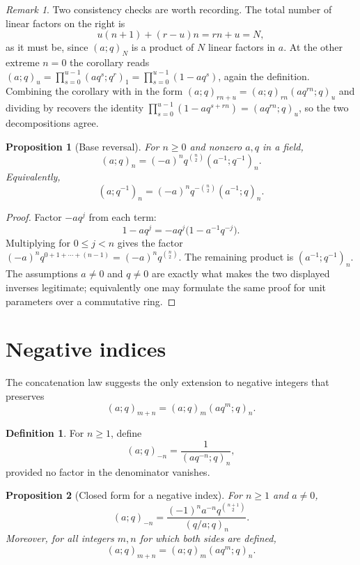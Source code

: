 \documentclass[11pt,a4paper,oneside,openany]{book}
\newtheorem{proposition}[proposition]{Proposition}
\theoremstyle{definition}
\newtheorem{definition}[definition]{Definition}
\theoremstyle{remark}
\newtheorem{remark}[remark]{Remark}
\begin{document}
\begin{remark}\label{rem:dissection-remainder-checks}
Two consistency checks are worth recording.  The total number of linear factors on the right is
\[
 u(n+1)+(r-u)n=rn+u=N,
\]
as it must be, since $(a;q)_N$ is a product of $N$ linear factors in $a$.  At the other extreme $n=0$ the corollary reads $(a;q)_u=\prod_{s=0}^{u-1}(aq^s;q^r)_1=\prod_{s=0}^{u-1}(1-aq^s)$, again the definition.  Combining the corollary with  in the form $(a;q)_{rn+u}=(a;q)_{rn}(aq^{rn};q)_u$ and dividing by  recovers the identity $\prod_{s=0}^{u-1}(1-aq^{s+rn})=(aq^{rn};q)_u$, so the two decompositions agree.
\end{remark}

\begin{proposition}[Base reversal]\label{prop:base-reversal}
For $n\ge0$ and nonzero $a,q$ in a field,
\[
 (a;q)_n=(-a)^n q^{\binom n2}(a^{-1};q^{-1})_n.
\]
Equivalently,
\[
 (a;q^{-1})_n=(-a)^nq^{-\binom n2}(a^{-1};q)_n.
\]
\end{proposition}

\begin{proof}
Factor $-aq^j$ from each term:
\[
 1-aq^j=-aq^j\bigl(1-a^{-1}q^{-j}\bigr).
\]
Multiplying for $0\le j<n$ gives the factor
\(
 (-a)^nq^{0+1+\cdots+(n-1)}=(-a)^nq^{\binom n2}.
\)
The remaining product is $(a^{-1};q^{-1})_n$.  The assumptions
$a\ne0$ and $q\ne0$ are exactly what makes the two displayed inverses
legitimate; equivalently one may formulate the same proof for unit parameters
over a commutative ring.
\end{proof}

\section{Negative indices}

The concatenation law suggests the only extension to negative integers that preserves
\[
 (a;q)_{m+n}=(a;q)_m(aq^m;q)_n.
\]

\begin{definition}\label{qg:def-negative-qshifted-index}
For $n\ge1$, define
\[
 (a;q)_{-n}=\frac{1}{(aq^{-n};q)_n},
\]
provided no factor in the denominator vanishes.
\end{definition}

\begin{proposition}[Closed form for a negative index]\label{prop:negative-index}
For $n\ge1$ and $a\ne0$,
\[
 (a;q)_{-n}
 =\frac{(-1)^n a^{-n}q^{\binom{n+1}{2}}}{(q/a;q)_n}.
\]
Moreover, for all integers $m,n$ for which both sides are defined,
\[
 (a;q)_{m+n}=(a;q)_m(aq^m;q)_n.
\]
\end{proposition}
\end{document}
